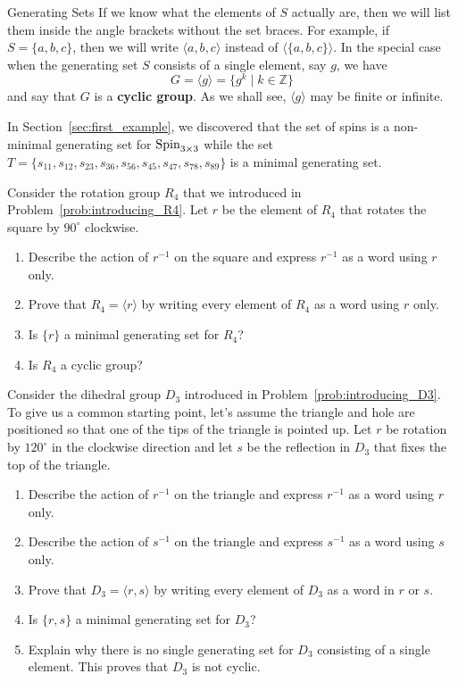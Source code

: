\begin{section}{Generating Sets}
If we know what the elements of $S$ actually are, then we will list them inside the angle brackets without the set braces.  For example, if $S=\{a,b,c\}$, then we will write $\langle a, b, c\rangle$ instead of $\langle \{a,b,c\}\rangle$. In the special case when the generating set $S$ consists of a single element, say $g$, we have
\[
G=\langle g\rangle =\{g^k\mid k\in\mathbb{Z}\}
\]
and say that $G$ is a \textbf{cyclic group}.  As we shall see, $\langle g\rangle$ may be finite or infinite. 

\begin{example}
In Section~\ref{sec:first_example}, we discovered that the set of spins is a non-minimal generating set for $\operatorname{Spin}_{3\times 3}$ while the set $T=\{s_{11}, s_{12}, s_{23}, s_{36}, s_{56}, s_{45}, s_{47}, s_{78}, s_{89}\}$ is a minimal generating set.
\end{example}

\begin{problem}
Consider the rotation group $R_4$ that we introduced in Problem~\ref{prob:introducing_R4}. Let $r$ be the element of $R_4$ that rotates the square by $90^\circ$ clockwise. 
\begin{enumerate}[label=\rm{(\alph*)}]
\item Describe the action of $r^{-1}$ on the square and express $r^{-1}$ as a word using $r$ only.
\item Prove that $R_4=\langle r\rangle$ by writing every element of $R_4$ as a word using $r$ only.
\item Is $\{r\}$ a minimal generating set for $R_4$?
\item Is $R_4$ a cyclic group?
\end{enumerate}
\end{problem}

\begin{problem}\label{prob:revisiting_D3}
Consider the dihedral group $D_3$ introduced in Problem~\ref{prob:introducing_D3}. To give us a common starting point, let's assume the triangle and hole are positioned so that one of the tips of the triangle is pointed up. Let $r$ be rotation by $120^\circ$ in the clockwise direction and let $s$ be the reflection in $D_3$ that fixes the top of the triangle.
\begin{enumerate}[label=\rm{(\alph*)}]
\item Describe the action of $r^{-1}$ on the triangle and express $r^{-1}$ as a word using $r$ only.
\item Describe the action of $s^{-1}$ on the triangle and express $s^{-1}$ as a word using $s$ only.
\item Prove that $D_3=\langle r,s\rangle$ by writing every element of $D_3$ as a word in $r$ or $s$.
\item Is $\{r,s\}$ a minimal generating set for $D_3$?
\item Explain why there is no single generating set for $D_3$ consisting of a single element. This proves that $D_3$ is not cyclic.
\end{enumerate}
\end{problem}


\end{section}
